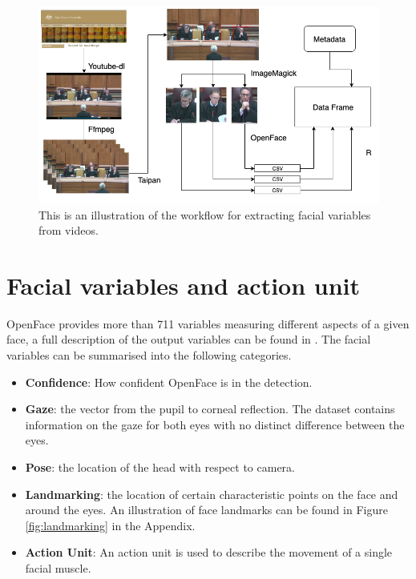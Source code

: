 \documentclass{monashthesis}
\begin{document}
\begin{figure}

{\centering \includegraphics[width=1\linewidth]{figures/workflow} 

}

\caption{This is an illustration of the workflow for extracting facial variables from videos. \label{fig:workflow}}\label{fig:unnamed-chunk-1}
\end{figure}

\hypertarget{facial-variables-and-action-unit}{%
\section{Facial variables and action unit}\label{facial-variables-and-action-unit}}

OpenFace provides more than 711 variables measuring different aspects of a given face, a full description of the output variables can be found in \textcite{baltrusaitis2018openface}. The facial variables can be summarised into the following categories.

\begin{itemize}
\tightlist
\item
  \textbf{Confidence}: How confident OpenFace is in the detection.
\item
  \textbf{Gaze}: the vector from the pupil to corneal reflection. The dataset contains information on the gaze for both eyes with no distinct difference between the eyes.
\item
  \textbf{Pose}: the location of the head with respect to camera.
\item
  \textbf{Landmarking}: the location of certain characteristic points on the face and around the eyes. An illustration of face landmarks can be found in Figure \ref{fig:landmarking} in the Appendix.
\item
  \textbf{Action Unit}: An action unit is used to describe the movement of a single facial muscle.
\end{itemize}
\end{document}
